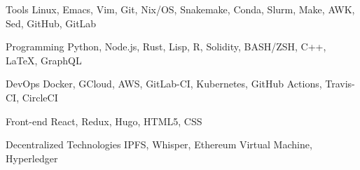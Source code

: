 
\begin{cvskills}

	\cvskill
	{Tools} %
	{Linux, Emacs, Vim, Git, Nix/OS, Snakemake, Conda, Slurm, Make, AWK, Sed, GitHub, GitLab} %

	\cvskill
	{Programming} %
	{Python, Node.js, Rust, Lisp, R, Solidity, BASH/ZSH, C++, LaTeX, GraphQL} %

	\cvskill
	{DevOps} %
	{Docker, GCloud, AWS, GitLab-CI, Kubernetes, GitHub Actions, Travis-CI, CircleCI} %

	\cvskill
	{Front-end} %
	{React, Redux, Hugo, HTML5, CSS} %

	\cvskill
	{Decentralized Technologies} %
	{IPFS, Whisper, Ethereum Virtual Machine, Hyperledger} %


\end{cvskills}
